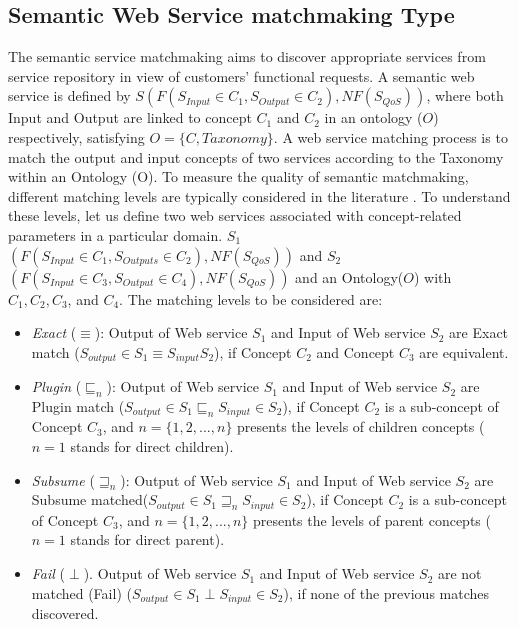 \documentclass{IEEEtran}
\begin{document}
\subsection{Semantic Web Service matchmaking Type}\label{semantic Web service Discovery}
The semantic service matchmaking aims to discover appropriate services from service repository in view of customers' functional requests. A semantic web service is defined by $S(F(S_{Input}\in C_{1}, S_{Output}\in C_{2}), NF(S_{QoS}))$, where both Input and Output are linked to concept $C_{1}$ and $C_{2}$ in an ontology ($O$) respectively, satisfying $O=\{C, Taxonomy\}$. A web service matching process is to match the output and input concepts of two services according to the Taxonomy within an Ontology (O). To measure the quality of semantic matchmaking, different matching levels are typically considered in the literature \cite{paolucci2002semantic}. To understand these levels, let us define two web services associated with concept-related parameters in a particular domain. $S_{1}$ $(F(S_{Input}\in C_{1}, S_{Outputs}\in C_{2}), NF(S_{QoS}))$ and  $S_{2}$ $(F(S_{Input}\in C_{3}, S_{Output}\in C_{4}), NF(S_{QoS}))$ and an Ontology($O$) with $C_{1},C_{2},C_{3}$, and $C_{4}$. The matching levels to be considered are:

\begin{itemize}
\item \textit{Exact} ($\equiv$): Output of Web service $S_{1}$ and Input of Web service $S_{2}$ are Exact match ($ S_{output} \in S_{1} \equiv S_{input}S_{2}$), if  Concept $C_{2}$ and Concept $C_{3}$ are equivalent.
\item \textit{Plugin} ($\sqsubseteq_{n}$): Output of Web service $S_{1}$ and Input of Web service $S_{2}$ are Plugin match ($S_{output} \in S_{1} \sqsubseteq_{n} S_{input} \in S_{2}$), if  Concept $C_{2}$ is a sub-concept of Concept $C_{3}$, and $n = \{1,2,...,n \}$ presents the levels of children concepts ($n=1$ stands for direct children).
\item \textit{Subsume} ($\sqsupseteq_{n}$): Output of Web service $S_{1}$ and Input of Web service $S_{2}$ are Subsume matched($S_{output} \in S_{1} \sqsupseteq_{n} S_{input} \in S_{2}$), if  Concept $C_{2}$ is a sub-concept of  Concept $C_{3}$, and $n = \{1,2,...,n \}$ presents the levels of parent concepts ($n=1$ stands for direct parent).
\item \textit{Fail} ($\perp$). Output of Web service $S_{1}$ and Input of Web service $S_{2}$ are not matched (Fail) ($S_{output} \in S_{1} \perp S_{input} \in S_{2}$), if none of the previous matches discovered.
\end{itemize}
\vspace{-0.5cm}
\end{document}
